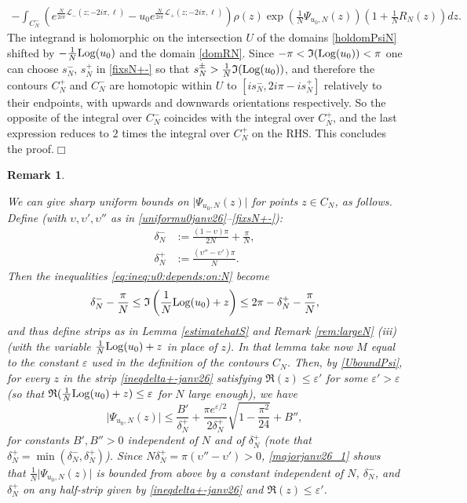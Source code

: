 \documentclass[11pt]{amsart}
\newtheorem{remark}[teo]{Remark}
\newcommand{\cvd}{\hfill$\Box$}
\newcommand{\Log}{{\rm Log}}
\def\cvd{\hfill$\Box$}
\begin{document}
{\begin{multline*}
		-  \int_{C^-_N} \left( e^{\frac{N}{2i\pi} \mathcal{L}_{-}(z;-2i\pi,\ell)}  - u_0 e^{\frac{N}{2i\pi} \mathcal{L}_{+}(z;-2i\pi,\ell)}\right)\rho(z)  \exp\left(\frac{1}{N}{\Psi_{u_0,N}(z)}\right) \left(1 + \frac{1}{N}R_N(z)\right) dz.
	\end{multline*}
The integrand is holomorphic on the intersection $U$ of the domains \eqref{holdomPsiN} shifted by $\textstyle -\frac{1}{N}\Log(u_{0})$ and the domain \eqref{domRN}. Since $-\pi <\mathfrak{I}(\Log(u_0))< \pi$ one can choose $s_N^-$, $s_N^+$ in \eqref{fixsN+-} so that $s_N^\pm > \textstyle \frac{1}{N} \mathfrak{I}(\Log(u_0))$, and therefore the contours $C^+_N$ and $C^-_N$ are homotopic within $U$ to $[is_N^-,2i\pi-is_N^+]$ relatively to their endpoints, with upwards and downwards orientations respectively. So the opposite of the integral over $C_N^-$ coincides with the integral over $C_N^+$, and the last expression reduces to $2$ times the integral over $C_N^+$ on the RHS. This concludes the proof.\cvd

\begin{remark}\label{sharpdeltaN+-janv26}{\rm We can give sharp uniform bounds on $\vert {\Psi_{u_0,N}(z)}\vert$ for points $z\in C_N$, as follows. Define (with $\upsilon,\upsilon',\upsilon''$ as in \eqref{uniformu0janv26}--\eqref{fixsN+-}):
\begin{align*}
\delta^-_N & := \frac{(1-\upsilon)\pi}{2N} + \frac{\pi}{N},\\
\delta^+_N & := \frac{(\upsilon''-\upsilon')\pi}{N}.
\end{align*}
Then the inequalities \eqref{eq:ineq:u0:depends:on:N} become
\begin{equation}\label{ineqdelta+-janv26}
\delta^-_N - \frac{\pi}{N}\leq \mathfrak{I}\left(\frac{1}{N}\Log(u_{0}) +z\right) \leq 2\pi -\delta^+_N - \frac{\pi}{N},
\end{equation} and thus define strips as in Lemma \ref{estimatehatS} and Remark \ref{rem:largeN} (iii) (with the variable $\textstyle \frac{1}{N}\Log(u_{0}) +z$ in place of $z$). In that lemma take now $M$ equal to the constant $\varepsilon$ used in the definition of the contours $C_N$. Then, by \eqref{UboundPsi}, for every $z$ in the strip \eqref{ineqdelta+-janv26} satisfying  $\textstyle \mathfrak{R}(z)\leq \varepsilon'$ for some $\varepsilon'>\varepsilon$ (so that $\textstyle \mathfrak{R}(\frac{1}{N}\Log(u_{0}) +z)\leq \varepsilon$ for $N$ large enough), we have 
\begin{equation}\label{majorjanv26_1}
\vert {\Psi_{u_0,N}(z)}\vert \leq \frac{B'}{\delta_N^+}+\dfrac{\pi e^{\varepsilon/2}}{2\delta_N^+}\sqrt{1- \frac{\pi^2}{24}}+B'',
\end{equation}
for constants $B',B''>0$ independent of $N$ and of $\delta_N^+$ (note that $\delta_N^+=\min(\delta_N^-,\delta_N^+)$). Since $N\delta_N^+ = \pi (\upsilon''-\upsilon')>0$, \eqref{majorjanv26_1} shows that $\textstyle \frac{1}{N}\vert {\Psi_{u_0,N}(z)}\vert$ is bounded from above by a constant independent of $N$, $\delta_N^-$, and $\delta_N^+$ on any half-strip given by \eqref{ineqdelta+-janv26} and $\textstyle \mathfrak{R}(z)\leq \varepsilon'$.

}
\end{remark}}
\end{document}
